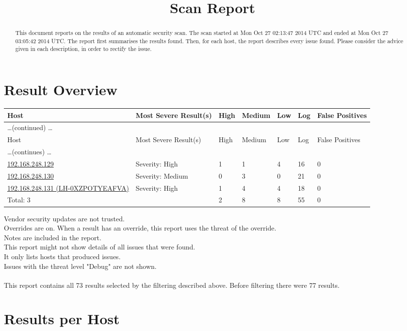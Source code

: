 \documentclass{article}
\title{Scan Report}\\
\begin{document}
\maketitle

\renewcommand{\abstractname}{Summary}
\begin{abstract}
This document reports on the results of an automatic security scan.
The scan started at Mon Oct 27 02:13:47 2014 UTC and ended at Mon Oct 27 03:05:42 2014 UTC.  The
report first summarises the results found.  Then, for each host,
the report describes every issue found.  Please consider the
advice given in each description, in order to rectify the issue.
\end{abstract}
\tableofcontents
\newpage
\section{Result Overview}

\begin{longtable}{|l|l|l|l|l|l|l|}
\hline
\rowcolor{openvas_report}Host&Most Severe Result(s)&High&Medium&Low&Log&False Positives\\
\hline
\endfirsthead
\multicolumn{6}{l}{\hfill\ldots (continued) \ldots}\\
\hline
\rowcolor{openvas_report}Host&Most Severe Result(s)&High&Medium&Low&Log&False Positives\\
\hline
\endhead
\hline
\multicolumn{6}{l}{\ldots (continues) \ldots}\\
\endfoot
\hline
\endlastfoot
\hline
\hyperref[host:192.168.248.129]{192.168.248.129}&Severity: High&1&1&4&16&0\\
\hline
\hyperref[host:192.168.248.130]{192.168.248.130}&Severity: Medium&0&3&0&21&0\\
\hline
\hyperref[host:192.168.248.131]{192.168.248.131 (LH-0XZPOTYEAFVA)}&Severity: High&1&4&4&18&0\\
\hline
\hline
Total: 3&&2&8&8&55&0\\
\hline
\end{longtable}
Vendor security updates are not trusted.\\
Overrides are on.  When a result has an override, this report uses the threat of the override.\\
Notes are included in the report.\\
This report might not show details of all issues that were found.\\
It only lists hosts that produced issues.\\
Issues with the threat level "Debug" are not shown.\\
\\
This report contains all 73 results selected by the filtering described above.  Before filtering there were 77 results.\section{Results per Host}
\end{document}
